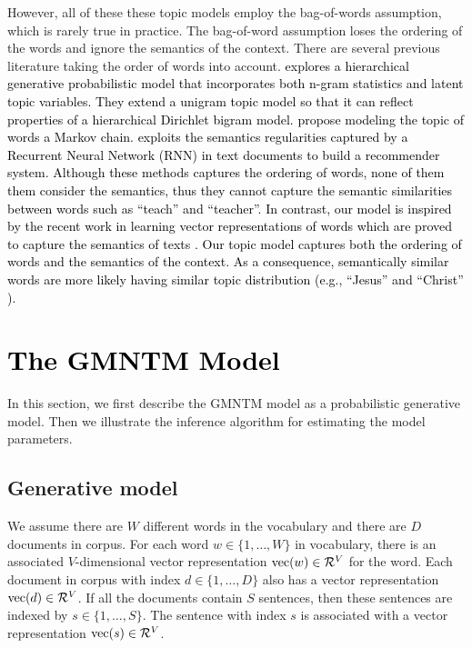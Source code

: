 \documentclass[english,letter]{article}
\renewcommand\[{\begin{equation}}
\renewcommand\]{\end{equation}}
\begin{document}
However, all of these these topic models employ the bag-of-words assumption,
which is rarely true in practice. The bag-of-word assumption loses
the ordering of the words and ignore the semantics of the context.\textcolor{green}{{}
}There are several previous literature taking the order of words into
account. \citeauthor{wallach2006topic} \textcolor{black}{{}
explores a hierarchical generative probabilistic model that incorporates
both n-gram statistics and latent topic variables. They extend a unigram
topic model so that it can reflect properties of a hierarchical Dirichlet
bigram model. }\citeauthor{gruber2007hidden} \textcolor{black}{{}
propose modeling the topic of words a Markov chain. }\citeauthor{florezdeep} \textcolor{black}{{}
exploits the semantics regularities captured by a Recurrent Neural
Network (RNN) in text documents to build a recommender system. Although
these methods captures the ordering of words, none of them them consider
the semantics, thus they cannot capture the semantic similarities
between words such as ``teach'' and ``teacher''. In contrast,
our model is inspired by the recent work in learning vector representations
of words which are proved to capture the semantics of texts \cite{mnih2009scalable,mnih2012fast,mnih2013learning,mikolov2013efficient,le2014distributed}.
Our topic model captures both the ordering of words and the semantics
of the context. As a consequence, semantically similar words are more
likely having similar topic distribution (e.g., ``Jesus'' and ``Christ''
).}


\section{\textcolor{black}{The GMNTM Model}}

In this section, we first describe the GMNTM model as a probabilistic
generative model. Then we illustrate the inference algorithm for estimating
the model parameters.


\subsection{Generative model}

We assume there are $W$ different words in the vocabulary and there
are $D$ documents in corpus. For each word $w\in\{1,\ldots,W\}$
in vocabulary, there is an associated $V$-dimensional vector representation
${\rm vec}(w)\in{\cal R}^{V}$ for the word. Each document in corpus
with index $d\in\{1,\ldots,D\}$ also has a vector representation
${\rm vec}(d)\in{\cal R}^{V}$. If all the documents contain $S$
sentences, then these sentences are indexed by $s\in\{1,\ldots,S\}$.
The sentence with index $s$ is associated with a vector representation
${\rm vec}(s)\in{\cal R}^{V}$.
\end{document}
